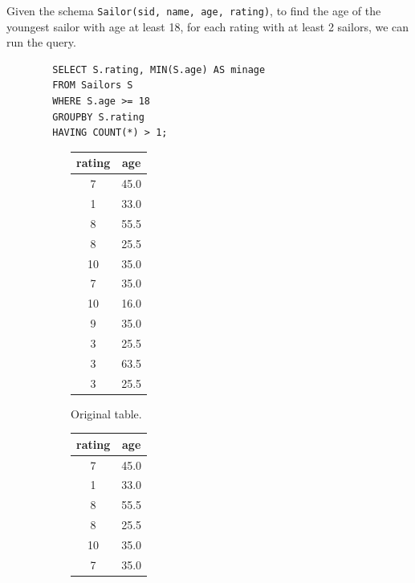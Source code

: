     \begin{example}
      \label{ex:finding-the-youngest-sailor}
      Given the schema \texttt{Sailor(sid, name, age, rating)}, to find the age of the youngest sailor with age at least 18, for each rating with at least 2 sailors, we can run the query. 
      \begin{lstlisting}
        SELECT S.rating, MIN(S.age) AS minage 
        FROM Sailors S 
        WHERE S.age >= 18
        GROUPBY S.rating 
        HAVING COUNT(*) > 1; 
      \end{lstlisting}

      \begin{figure}[H]
        \centering
        \begin{subfigure}[b]{0.32\textwidth}
          \centering
          \begin{tabular}{|c|c|}
            \hline
            rating & age \\
            \hline
            7 & 45.0 \\
            1 & 33.0 \\
            8 & 55.5 \\
            8 & 25.5 \\
            10 & 35.0 \\
            7 & 35.0 \\
            10 & 16.0 \\
            9 & 35.0 \\
            3 & 25.5 \\
            3 & 63.5 \\
            3 & 25.5 \\
            \hline
          \end{tabular}
          \caption{Original table.}
          \label{fig:table1}
        \end{subfigure}
        \hfill 
        \begin{subfigure}[b]{0.32\textwidth}
          \centering
          \begin{tabular}{|c|c|}
            \hline
            rating & age \\
            \hline
            7 & 45.0 \\
            1 & 33.0 \\
            8 & 55.5 \\
            8 & 25.5 \\
            10 & 35.0 \\
            7 & 35.0 \\

\end{tabular}
\end{subfigure}
\end{figure}
\end{example}
